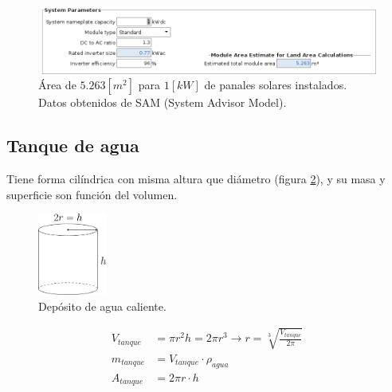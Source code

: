 \begin{figure}[h] \centering
	\centering
	\includegraphics[width=1\textwidth]{./capitulos/resultados_discusion/images/solar_panel_area.png}
	\caption{Área de $5.263[m^2]$ para $1[kW]$ de panales solares instalados. Datos obtenidos de SAM (System Advisor Model).}
	\label{fig:solar_panel_area}
\end{figure}


\subsection{Tanque de agua}

Tiene forma cilíndrica con misma altura que diámetro (figura
\ref{fig:water_tank}), y su masa y superficie son función del volumen.

\begin{figure}[h] \centering
	\centering
	\includegraphics[width=0.2\textwidth]{./capitulos/resultados_discusion/images/water_tank.png}
	\caption{Depósito de agua caliente.}
	\label{fig:water_tank}
\end{figure}

\begin{align} \label{eq:tank_mass_and_area}
	V_{tanque} & = \pi r^2 h = 2 \pi r^3 \rightarrow r = \sqrt[3]{\frac{V_{tanque}}{2\pi}} \\
	m_{tanque} & = V_{tanque} \cdot \rho_{agua} \\
	A_{tanque} & = 2 \pi r \cdot h
\end{align}
